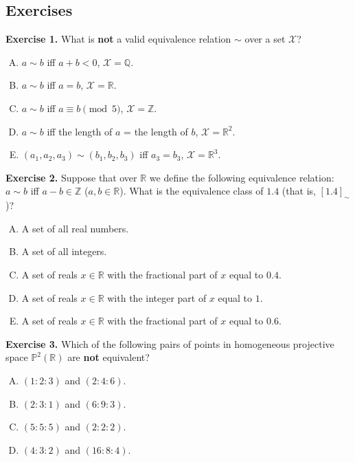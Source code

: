 \documentclass[../lecture-notes.tex]{subfiles}
\begin{document}
\newpage
\subsection{Exercises}

\textbf{Exercise 1.} What is \textbf{not} a valid equivalence relation $\sim$ over a set $\mathcal{X}$?
\begin{enumerate}[(A)]
    \item $a \sim b$ iff $a+b < 0$, $\mathcal{X} = \mathbb{Q}$.
    \item $a\sim b$ iff $a=b$, $\mathcal{X} = \mathbb{R}$.
    \item $a\sim b$ iff $a \equiv b \pmod{5}$, $\mathcal{X} = \mathbb{Z}$.
    \item $a\sim b$ iff the length of $a$ = the length of $b$, $\mathcal{X} = \mathbb{R}^2$.
    \item $(a_1,a_2,a_3)\sim (b_1,b_2,b_3)$ iff $a_3=b_3$, $\mathcal{X} = \mathbb{R}^3$.
\end{enumerate}

\textbf{Exercise 2.} Suppose that over $\mathbb{R}$ we define the following equivalence relation: $a \sim b$ iff $a-b \in \mathbb{Z}$ ($a,b \in \mathbb{R}$). What is the equivalence class of $1.4$ (that is, $[1.4]_{\sim}$)?
\begin{enumerate}[(A)]
    \item A set of all real numbers.
    \item A set of all integers.
    \item A set of reals $x \in \mathbb{R}$ with the fractional part of $x$ equal to $0.4$.
    \item A set of reals $x \in \mathbb{R}$ with the integer part of $x$ equal to $1$.
    \item A set of reals $x \in \mathbb{R}$ with the fractional part of $x$ equal to $0.6$.
\end{enumerate}

\textbf{Exercise 3.} Which of the following pairs of points in homogeneous projective space $\mathbb{P}^2(\mathbb{R})$ are \textbf{not} equivalent?
\begin{multicols}{2}
    \begin{enumerate}[(A)]
        \item $(1:2:3)$ and $(2:4:6)$.
        \item $(2:3:1)$ and $(6:9:3)$.
        \item $(5:5:5)$ and $(2:2:2)$.
        \item $(4:3:2)$ and $(16:8:4)$.
    \end{enumerate}
\end{multicols}
\end{document}
